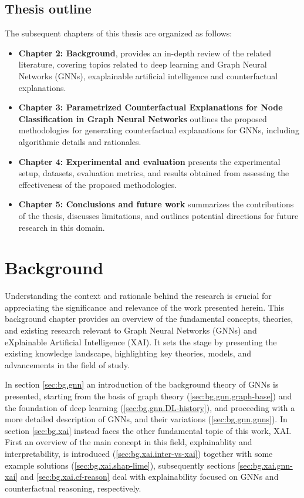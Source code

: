 \documentclass[binding=0.6cm]{sapthesis}
\begin{document}
\section{Thesis outline}
The subsequent chapters of this thesis are organized as follows:
\begin{itemize}
    \item \textbf{Chapter 2: Background}, provides an in-depth review of the related literature, covering topics related to deep learning and Graph Neural Networks (GNNs), exaplainable artificial intelligence and counterfactual explanations.
    \item \textbf{Chapter 3: Parametrized Counterfactual Explanations for Node Classification in Graph Neural Networks} outlines the proposed methodologies for generating counterfactual explanations for GNNs, including algorithmic details and rationales.
    \item \textbf{Chapter 4: Experimental and evaluation} presents the experimental setup, datasets, evaluation metrics, and results obtained from assessing the effectiveness of the proposed methodologies.
    \item \textbf{Chapter 5: Conclusions and future work} summarizes the contributions of the thesis, discusses limitations, and outlines potential directions for future research in this domain.
\end{itemize}




\chapter{Background}
\label{chap:2-background}
Understanding the context and rationale behind the research is crucial for appreciating the significance and relevance of the work presented herein. This background chapter provides an overview of the fundamental concepts, theories, and existing research relevant to Graph Neural Networks (GNNs) and eXplainable Artificial Intelligence (XAI). It sets the stage by presenting the existing knowledge landscape, highlighting key theories, models, and advancements in the field of study.

In section \ref{sec:bg.gnn} an introduction of the background theory of GNNs is presented, starting from the basis of graph theory (\cref{sec:bg.gnn.graph-base}) and the foundation of deep learning (\cref{sec:bg.gnn.DL-history}), and proceeding with a more detailed description of GNNs, and their variations (\cref{sec:bg.gnn.gnns}). In section \ref{sec:bg.xai} instead faces the other fundamental topic of this work, XAI. First an overview of the main concept in this field, explainablity and interpretability, is introduced (\cref{sec:bg.xai.inter-vs-xai}) together with some example solutions (\cref{sec:bg.xai.shap-lime}), subsequently sections \ref{sec:bg.xai.gnn-xai} and \ref{sec:bg.xai.cf-reason} deal with explainability focused on GNNs and counterfactual reasoning, respectively.
\end{document}

